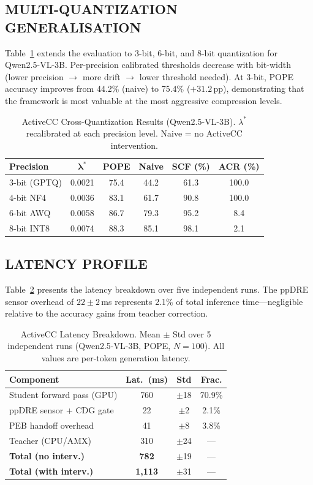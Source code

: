 \documentclass{ieeetmlcn}
\begin{document}
\subsection{MULTI-QUANTIZATION GENERALISATION}
Table~\ref{tab:multiquant} extends the evaluation to 3-bit, 6-bit, and
8-bit quantization for Qwen2.5-VL-3B. Per-precision calibrated
thresholds decrease with bit-width (lower precision $\to$ more drift
$\to$ lower threshold needed). At 3-bit, POPE accuracy improves from
44.2\% (naive) to 75.4\% ($+31.2$\,pp), demonstrating that the
framework is most valuable at the most aggressive compression levels.

\begin{table}[htbp]
\caption{ActiveCC Cross-Quantization Results (Qwen2.5-VL-3B).
$\lambda^*$ recalibrated at each precision level. Naive = no ActiveCC
intervention.}
\label{tab:multiquant}
\centering
\begin{tabular}{lccccc}
\toprule
\textbf{Precision} & $\boldsymbol{\lambda^*}$ & \textbf{POPE} &
\textbf{Naive} & \textbf{SCF (\%)} & \textbf{ACR (\%)} \\
\midrule
3-bit (GPTQ) & 0.0021 & 75.4 & 44.2 & 61.3 & 100.0 \\
4-bit NF4    & 0.0036 & 83.1 & 61.7 & 90.8 & 100.0 \\
6-bit AWQ    & 0.0058 & 86.7 & 79.3 & 95.2 &   8.4 \\
8-bit INT8   & 0.0074 & 88.3 & 85.1 & 98.1 &   2.1 \\
\bottomrule
\end{tabular}
\end{table}

\subsection{LATENCY PROFILE}
Table~\ref{tab:latency} presents the latency breakdown over five
independent runs. The ppDRE sensor overhead of $22\pm2$\,ms represents
2.1\% of total inference time---negligible relative to the accuracy
gains from teacher correction.

\begin{table}[htbp]
\caption{ActiveCC Latency Breakdown. Mean $\pm$ Std over 5 independent runs (Qwen2.5-VL-3B, POPE, $N=100$). All values are per-token generation latency.}
\label{tab:latency}
\centering
\begin{tabular}{p{3.8cm}ccc}
\toprule
\textbf{Component} & \textbf{Lat.\ (ms)} & \textbf{Std} & \textbf{Frac.} \\
\midrule
Student forward pass (GPU)   & 760 & $\pm$18 & 70.9\% \\
ppDRE sensor + CDG gate      &  22 & $\pm$2  &  2.1\% \\
PEB handoff overhead         &  41 & $\pm$8  &  3.8\% \\
Teacher (CPU/AMX)            & 310 & $\pm$24 & ---    \\
\midrule
\textbf{Total (no interv.)}  & \textbf{782}   & $\pm$19 & --- \\
\textbf{Total (with interv.)}& \textbf{1,113} & $\pm$31 & --- \\
\bottomrule
\end{tabular}
\end{table}
\end{document}
